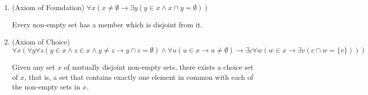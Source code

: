 \documentclass[11pt]{article}
\theoremstyle{definition}
\begin{document}
\begin{enumerate}
\item (Axiom of Foundation) $\forall x (x \neq \emptyset \rightarrow \exists y (y \in x \land x \cap y = \emptyset))$

Every non-empty set has a member which is disjoint from it.

\item (Axiom of Choice) $\forall x (\forall y \forall z (y \in x \land z \in x \land y \neq z \rightarrow y \cap z = \emptyset) \land \forall u (u \in x \rightarrow u \neq \emptyset) \rightarrow \exists c \forall w (w \in x \rightarrow \exists v(c \cap w = \{v\})))$

Given any set $x$ of mutually disjoint non-empty sets, there exists a choice set of $x$, that is, a set that contains exactly one element in common with each of the non-empty sets in $x$.

\end{enumerate}
\end{document}
